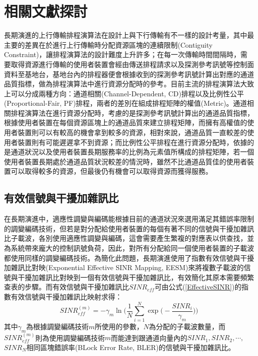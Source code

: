%
\chapter{相關文獻探討}
長期演進的上行傳輸排程演算法在設計上與下行傳輸有不一樣的設計考量，其中最主要的差異在於進行上行傳輸時分配資源區塊的連續限制(Contiguity Constraint)，讓排程演算法的設計難度上升許多；在每一次傳輸時間間隔時，需要取得資源進行傳輸的使用者裝置會經由傳送排程請求以及探測參考訊號等控制面資料至基地台，基地台內的排程器便會根據收到的探測參考訊號計算出對應的通道品質指標，做為排程演算法中進行資源分配時的參考。目前主流的排程演算法大致上可以分成兩種方向：通道相關(Channel-Dependent, CD)排程以及比例性公平(Proportional-Fair, PF)排程\cite{safa2013ieee}，兩者的差別在組成排程矩陣的權值(Metric)。通道相關排程演算法在進行資源分配時，考慮的是探測參考訊號計算出的通道品質指標，根據使用者裝置在每個資源區塊上的通道品質來建立排程矩陣，而擁有高權值的使用者裝置則可以有較高的機會拿到較多的資源，相對來說，通道品質一直較差的使用者裝置則有可能遲遲拿不到資源；而比例性公平排程在進行資源分配時，依據的是通道狀況以及使用者裝置長期服務率的比例為元素值所構成的排程矩陣，若一個使用者裝置長期處於通道品質狀況較差的情況時，雖然不比通道品質佳的使用者裝置可以取得較多的資源，但最後仍有機會可以取得資源而獲得服務。

\section{有效信號與干擾加雜訊比}
在長期演進中，適應性調變與編碼能根據目前的通道狀況來選用滿足其錯誤率限制的調變編碼技術，但若是對分配給使用者裝置的每個有著不同的信號與干擾加雜訊比子載波，各別使用適應性調變與編碼，這會需要產生繁複的對應表以供查找，並為系統帶來龐大的控制訊號負荷\cite{francis2014ieee}，因此，對所有分配給同一個使用者裝置的子載波都使用同樣的調變編碼技術。為簡化此問題，長期演進使用了指數有效信號與干擾加雜訊比對映(Exponential Effective SINR Mapping, EESM)來將複數子載波的信號與干擾加雜訊比對映到一個有效信號與干擾加雜訊比，有效簡化其原本需要頻繁查表的步驟。而有效信號與干擾加雜訊比$SINR_{eff}$可由公式(\ref{EffectiveSINR})\cite{ben2015}的指數有效信號與干擾加雜訊比映射求得：
\begin{equation}
\label{EffectiveSINR}
SINR_{eff}^{(m)}=-\gamma_m\ln\Bigg(\dfrac{1}{N}\displaystyle\sum_{i=1}^{N}\exp\bigg(-\dfrac{SINR_i}{\gamma_m}\bigg)\Bigg)
\end{equation}
其中$\gamma_m$為根據調變編碼技術$m$所使用的參數，$N$為分配的子載波數量，而$SINR_{eff}^{(m)}$則為使用調變編碼技術$m$而能達到跟通道向量內的$SINR_1,SINR_2,\cdots,$\\$SINR_N$相同區塊錯誤率(BLock Error Rate, BLER)的信號與干擾加雜訊比。
